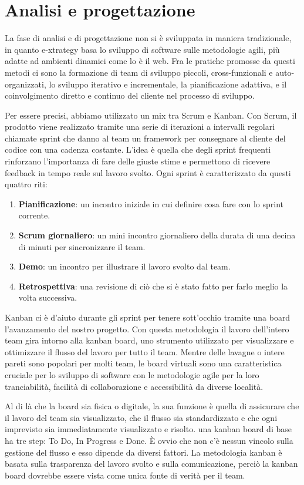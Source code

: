 \section{Analisi e progettazione}
La fase di analisi e di progettazione non si è sviluppata in maniera tradizionale, in quanto e-xtrategy basa lo sviluppo di software sulle metodologie agili, più adatte ad ambienti dinamici come lo è il web.
Fra le pratiche promosse da questi metodi ci sono la formazione di team di sviluppo piccoli, cross-funzionali e auto-organizzati, 
lo sviluppo iterativo e incrementale, la pianificazione adattiva, e il coinvolgimento diretto e continuo del cliente nel processo di sviluppo.

Per essere precisi, abbiamo utilizzato un mix tra Scrum e Kanban.
Con Scrum\cite{scrum}, il prodotto viene realizzato tramite una serie di iterazioni a intervalli regolari chiamate sprint che danno al team un framework per consegnare al cliente del codice con una cadenza costante.
L'idea è quella che degli sprint frequenti rinforzano l'importanza di fare delle giuste stime e permettono di ricevere feedback in tempo reale sul lavoro svolto.
Ogni sprint è caratterizzato da questi quattro riti:
\begin{enumerate}
\item \textbf{Pianificazione}: un incontro iniziale in cui definire cosa fare con lo sprint corrente.
\item \textbf{Scrum giornaliero}: un mini incontro giornaliero della durata di una decina di minuti per sincronizzare il team. 
\item \textbf{Demo}: un incontro per illustrare il lavoro svolto dal team.
\item \textbf{Retrospettiva}: una revisione di ciò che si è stato fatto per farlo meglio la volta successiva.
\end{enumerate} 

Kanban\cite{kanban} ci è d'aiuto durante gli sprint per tenere sott'occhio tramite una board l'avanzamento del nostro progetto.
Con questa metodologia il lavoro dell'intero team gira intorno alla kanban board, uno strumento utilizzato per visualizzare e ottimizzare il flusso del lavoro per tutto il team.
Mentre delle lavagne o intere pareti sono popolari per molti team, le board virtuali sono una caratteristica cruciale per lo sviluppo di software con le metodologie agile per la loro tranciabilità, facilità di collaborazione e accessibilità da diverse località.

Al di là che la board sia fisica o digitale, la sua funzione è quella di assicurare che il lavoro del team sia visualizzato, che il flusso sia standardizzato e che ogni imprevisto sia immediatamente visualizzato e risolto.
una kanban board di base ha tre step: To Do, In Progress e Done.
È ovvio che non c'è nessun vincolo sulla gestione del flusso e esso dipende da diversi fattori.
La metodologia kanban è basata sulla trasparenza del lavoro svolto e sulla comunicazione,
perciò  la kanban board dovrebbe essere vista come unica fonte di verità per il team. 

